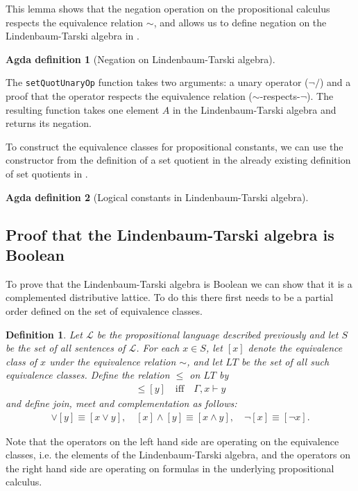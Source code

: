 \documentclass[titlepage]{article}
\newtheorem{definition}{Definition}[section]
\newtheorem{agdadef}{Agda definition}
\begin{document}
This lemma shows that the negation operation on the propositional calculus respects the equivalence relation $\sim$, and allows us to define negation on the Lindenbaum-Tarski algebra in \CubicalAgda.

\begin{agdadef}[Negation on Lindenbaum-Tarski algebra]$ $
\end{agdadef}


The \texttt{setQuotUnaryOp} function takes two arguments: a unary operator ($\neg/$) and a proof that the operator respects the equivalence relation ($\sim$-respects-$\neg$). The resulting function takes one element $A$ in the Lindenbaum-Tarski algebra and returns its negation.

To construct the equivalence classes for propositional constants, we can use the constructor from the definition of a set quotient in the already existing definition of set quotients in \CubicalAgda.

\begin{agdadef}[Logical constants in Lindenbaum-Tarski algebra]$ $
\end{agdadef}


\subsection{Proof that the Lindenbaum-Tarski algebra is Boolean}

To prove that the Lindenbaum-Tarski algebra is Boolean we can show that it is a complemented distributive lattice. To do this there first needs to be a partial order defined on the set of equivalence classes.
\begin{definition}\label{order-relation}
    Let $\mathcal{L}$ be the propositional language described previously and let $S$ be the set of all sentences of $\mathcal{L}$. For each $x\in S$, let $[x]$ denote the equivalence class of $x$ under the equivalence relation $\sim$, and let $LT$ be the set of all such equivalence classes. Define the relation $\leq$ on $LT$ by
    \begin{align*}
        [x] \leq [y] \quad \text{iff} \quad \Gamma, x \vdash y
    \end{align*}
    and define join, meet and complementation as follows:
    \begin{align*}
        [x] \vee [y] \equiv [x\vee y], \quad [x] \wedge [y] \equiv [x \wedge y], \quad \neg[x] \equiv [\neg x].
    \end{align*}
\end{definition}
Note that the operators on the left hand side are operating on the equivalence classes, i.e. the elements of the Lindenbaum-Tarski algebra, and the operators on the right hand side are operating on formulas in the underlying propositional calculus.
\end{document}
